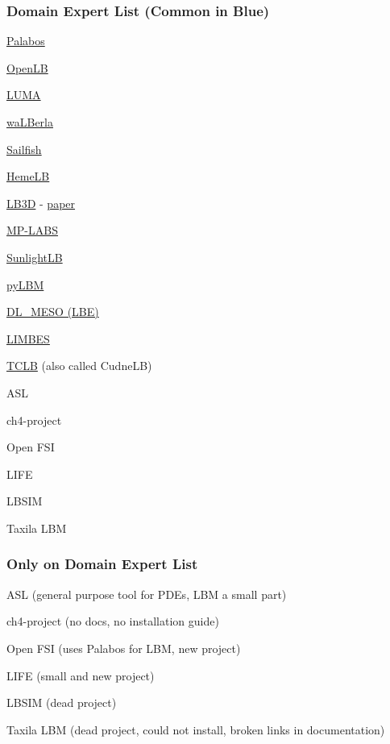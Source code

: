 \documentclass[t,12pt,numbers,fleqn]{beamer}
\begin{document}

\begin{frame}
\frametitle{Domain Expert List (Common in Blue)}

\begin{multicols}{2}	
  \bi
\item \href{https://palabos.unige.ch/}{Palabos}
\item \href{https://www.openlb.net/}{OpenLB}
\item \href{https://github.com/aharwood2/LUMA/}{LUMA}
\item \href{https://www.walberla.net}{waLBerla}
\item \href{http://sailfish.us.edu.pl/}{Sailfish}
\item \href{https://github.com/UCL/hemelb}{HemeLB}
\item \href{http://ccs.chem.ucl.ac.uk/lb3d}{LB3D} - \href{https://www.sciencedirect.com/science/article/pii/S0010465517301017}{paper}
\item \href{https://github.com/carlosrosales/mplabs}{MP-LABS}
\item \href{http://sunlightlb.sourceforge.net/}{SunlightLB}
\item \href{https://pypi.org/project/pylbm/}{pyLBM}
\item  \href{https://www.scd.stfc.ac.uk/Pages/DL_MESO.aspx}{DL\_MESO (LBE)}
\item \href{https://code.google.com/archive/p/limbes/}{LIMBES}
\item \href{https://docs.tclb.io/}{TCLB} (also called CudneLB)
  \item ASL 
\item ch4-project
\item Open FSI
\item LIFE
\item LBSIM
\item Taxila LBM                    

\ei
\end{multicols}

\end{frame}


\begin{frame}
\frametitle{Only on Domain Expert List}

  \bi
\item ASL (general purpose tool for PDEs, LBM a small part)
\item ch4-project (no docs, no installation guide)
\item Open FSI (uses Palabos for LBM, new project)
\item LIFE (small and new project)
\item LBSIM (dead project)
\item Taxila LBM (dead project, could not install, broken links in
  documentation)                    
	\ei

\end{frame}
\end{document}
